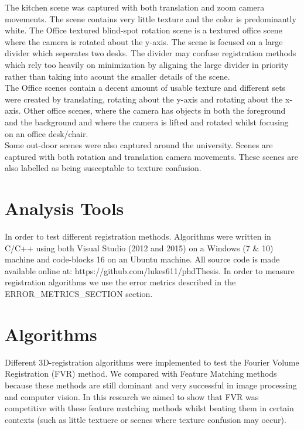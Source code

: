 The kitchen scene was captured with both translation and zoom camera movements. The scene contains very little texture and the color is predominantly white. The Office textured blind-spot rotation scene is a textured office scene where the camera is rotated about the y-axis. The scene is focused on a large divider which seperates two desks. The divider may confuse registration methods which rely too heavily on minimization by aligning the large divider in priority rather than taking into acount the smaller details of the scene. \\

The Office scenes contain a decent amount of usable texture and different sets were created by translating, rotating about the y-axis and rotating about the x-axis. Other office scenes, where the camera has objects in both the foreground and the background and where the camera is lifted and rotated whilst focusing on an office desk/chair. \\

Some out-door scenes were also captured around the university. Scenes are captured with both rotation and translation camera movements. These scenes are also labelled as being susceptable to texture confusion.

\section{Analysis Tools}

In order to test different registration methods. Algorithms were written in C/C++ using both Visual Studio (2012 and 2015) on a Windows (7 & 10) machine and code-blocks 16 on an Ubuntu machine. All source code is made available online at: https://github.com/lukes611/phdThesis. In order to measure registration algorithms we use the error metrics described in the ERROR_METRICS_SECTION section.  

\section{Algorithms}

Different 3D-registration algorithms were implemented to test the Fourier Volume Registration (FVR) method. We compared with Feature Matching methods because these methods are still dominant and very successful in image processing and computer vision. In this research we aimed to show that FVR was competitive with these feature matching methods whilst beating them in certain contexts (such as little textuere or scenes where texture confusion may occur). \\ 

